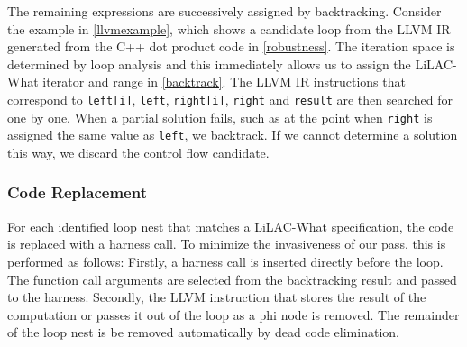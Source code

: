The remaining expressions are successively assigned by backtracking.
Consider the example in \autoref{llvmexample}, which shows a candidate loop from
the LLVM IR generated from the C++ dot product code in \autoref{robustness}.
The iteration space is determined by loop analysis and this immediately allows us
to assign the LiLAC-What iterator and range in \autoref{backtrack}.
The LLVM IR instructions that correspond to \texttt{left[i]}, \texttt{left},
\texttt{right[i]}, \texttt{right} and \texttt{result} are then searched for one
by one.
When a partial solution fails, such as at the point when \texttt{right} is
assigned the same value as \texttt{left}, we backtrack.
If we cannot determine a solution this way, we discard the control flow
candidate.

\subsubsection{Code Replacement}
For each identified loop nest that matches a LiLAC-What specification, the code
is replaced with a harness call.
To minimize the invasiveness of our pass, this is performed as follows:
Firstly, a harness call is inserted directly before the loop.
The function call arguments are selected from the backtracking result and passed
to the harness.
Secondly, the LLVM instruction that stores the result of the computation or
passes it out of the loop as a phi node is removed.
The remainder of the loop nest is be removed automatically by dead code
elimination.

